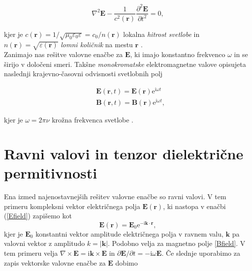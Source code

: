 \documentclass[longbibliography,slovene,a4paper,12pt]{book}
\newcommand{\E}{\text{e}}
\newcommand{\I}{\text{i}}
\begin{document}
 \begin{equation}
 \nabla^2 \mathbf{E} - \frac{1}{c^2(\mathbf{r})} \frac{\partial^2 \mathbf{E}}{\partial t^2} = 0,
  \label{Ewaveequation}
 \end{equation}
 
 kjer je $c(\mathbf{r}) = 1/\sqrt{\mu_0 \varepsilon_0 \varepsilon} = c_0/n(\mathbf{r})$ lokalna \emph{hitrost svetlobe} in $n(\mathbf{r}) = \sqrt{\varepsilon(\mathbf{r})}$ \emph{lomni količnik} na mestu $\mathbf{r}$ \cite{saleh}.\\
 
 Zanimajo nas rešitve valovne enačbe za $\mathbf{E}$, ki imajo konstantno frekvenco $\omega$ in se širijo v določeni smeri. Takšne \emph{monokromatske} elektromagnetne valove opisujeta naslednji krajevno-časovni odvisnosti svetlobnih polj 
 
 \begin{align}
 &\mathbf{E} (\mathbf{r}, t) = \mathbf{E}(\mathbf{r}) \E^{\I \omega t} \label{Efield}\\
 &\mathbf{B} (\mathbf{r}, t) = \mathbf{B}(\mathbf{r}) \E^{\I \omega t} \label{Bfield}, 
 \end{align}
 
kjer je $\omega = 2\pi \nu$ krožna frekvenca svetlobe \cite{saleh}.

\section{Ravni valovi in tenzor dielektrične permitivnosti}

Ena izmed najenostavnejših rešitev valovne enačbe so ravni valovi. V tem primeru kompleksni vektor električnega polja $\mathbf{E(\mathbf{r})}$, ki nastopa v enačbi (\ref{Efield}) zapišemo kot
\begin{equation}
\mathbf{E} (\mathbf{r}) = \mathbf{E}_0 \E^{-\I\mathbf{k} \cdot \mathbf{r}},
\end{equation}
kjer je $\mathbf{E}_0$ konstantni vektor amplitude električnega polja v ravnem valu, $\mathbf{k}$ pa valovni vektor z amplitudo $k = |\mathbf{k}|$. Podobno velja za magnetno polje \ref{Bfield}. V tem primeru velja $\nabla \times \mathbf{E} = \I \mathbf{k}\times \mathbf{E}$ in $\partial \mathbf{E}/\partial t=-\I \omega \mathbf{E}$. Če slednje uporabimo za zapis vektorske valovne enačbe za $\mathbf{E}$ dobimo
\end{document}
